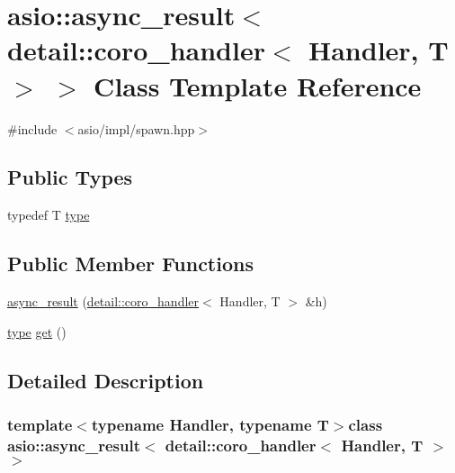 \hypertarget{classasio_1_1async__result_3_01detail_1_1coro__handler_3_01_handler_00_01_t_01_4_01_4}{}\section{asio\+:\+:async\+\_\+result$<$ detail\+:\+:coro\+\_\+handler$<$ Handler, T $>$ $>$ Class Template Reference}
\label{classasio_1_1async__result_3_01detail_1_1coro__handler_3_01_handler_00_01_t_01_4_01_4}


{\ttfamily \#include $<$asio/impl/spawn.\+hpp$>$}

\subsection*{Public Types}
\begin{DoxyCompactItemize}
\item 
typedef T \hyperlink{classasio_1_1async__result_3_01detail_1_1coro__handler_3_01_handler_00_01_t_01_4_01_4_ae65f75e8d2f331be17e568287c883ad3}{type}
\end{DoxyCompactItemize}
\subsection*{Public Member Functions}
\begin{DoxyCompactItemize}
\item 
\hyperlink{classasio_1_1async__result_3_01detail_1_1coro__handler_3_01_handler_00_01_t_01_4_01_4_a560ae298ce87824774a42623e20a999e}{async\+\_\+result} (\hyperlink{classasio_1_1detail_1_1coro__handler}{detail\+::coro\+\_\+handler}$<$ Handler, T $>$ \&h)
\item 
\hyperlink{classasio_1_1async__result_3_01detail_1_1coro__handler_3_01_handler_00_01_t_01_4_01_4_ae65f75e8d2f331be17e568287c883ad3}{type} \hyperlink{classasio_1_1async__result_3_01detail_1_1coro__handler_3_01_handler_00_01_t_01_4_01_4_a3e746e4873af50c599a5ec4593ca5a1d}{get} ()
\end{DoxyCompactItemize}


\subsection{Detailed Description}
\subsubsection*{template$<$typename Handler, typename T$>$class asio\+::async\+\_\+result$<$ detail\+::coro\+\_\+handler$<$ Handler, T $>$ $>$}



